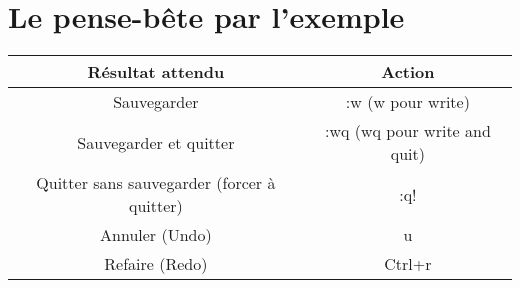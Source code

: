 \chapter{Le pense-bête par l'exemple}
\bigskip
\begin{tabular}[H]{|c|c|}
  \hline
  Résultat attendu & Action\\
  \hline
  Sauvegarder & :w (w pour write)\\
  Sauvegarder et quitter & :wq (wq pour write and quit)\\
  Quitter sans sauvegarder (forcer à quitter) & :q! \\
  Annuler (Undo) & u \\
  Refaire (Redo) & Ctrl+r \\
  \hline
\end{tabular}
\bigskip

